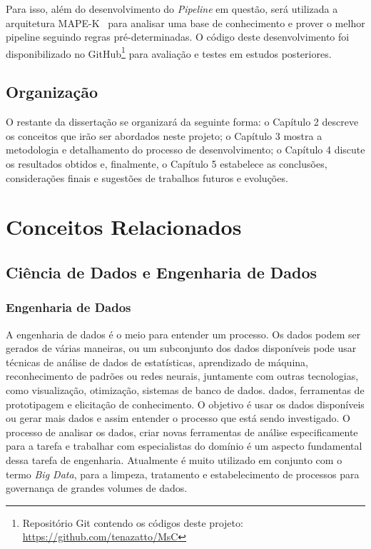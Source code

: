 \documentclass[portugues]{ic-tese}
\begin{document}
Para isso, além do desenvolvimento do \textit{Pipeline} em questão, será utilizada a arquitetura MAPE-K~\citep{IBM_2005} para analisar uma base de conhecimento e prover o melhor pipeline seguindo regras pré-determinadas. O código deste desenvolvimento foi disponibilizado no GitHub\footnote{Repositório Git contendo os códigos deste projeto: \url{https://github.com/tenazatto/MsC}} para avaliação e testes em estudos posteriores.

\section{Organização}

O restante da dissertação se organizará da seguinte forma: o Capítulo 2 descreve os conceitos que irão ser abordados neste projeto; o Capítulo 3 mostra a metodologia e detalhamento do processo de desenvolvimento; o Capítulo 4 discute os resultados obtidos e, finalmente, o Capítulo 5 estabelece as conclusões, considerações finais e sugestões de trabalhos futuros e evoluções.

\chapter{Conceitos Relacionados}

\section{Ciência de Dados e Engenharia de Dados}

\subsection{Engenharia de Dados}

A engenharia de dados é o meio para entender um processo. Os dados podem ser gerados de várias maneiras, ou um subconjunto dos dados disponíveis pode usar técnicas de análise de dados de estatísticas, aprendizado de máquina, reconhecimento de padrões ou redes neurais, juntamente com outras tecnologias, como visualização, otimização, sistemas de banco de dados. dados, ferramentas de prototipagem e elicitação de conhecimento. O objetivo é usar os dados disponíveis ou gerar mais dados e assim entender o processo que está sendo investigado. O processo de analisar os dados, criar novas ferramentas de análise especificamente para a tarefa e trabalhar com especialistas do domínio é um aspecto fundamental dessa tarefa de engenharia. Atualmente é muito utilizado em conjunto com o termo \textit{Big Data}, para a limpeza, tratamento e estabelecimento de processos para governança de grandes volumes de dados.
\end{document}
